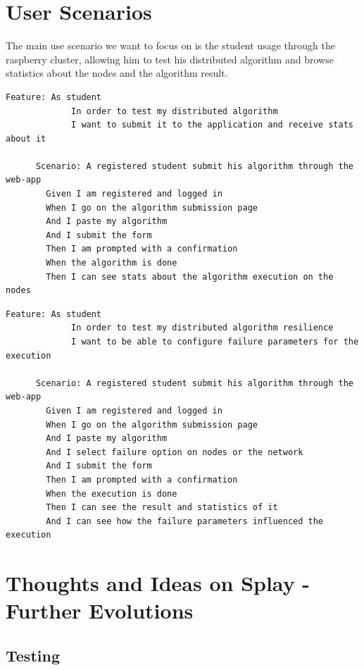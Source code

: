 \documentclass{article}
\begin{document}
\section{User Scenarios}

  The main use scenario we want to focus on is the student usage
  through the raspberry cluster, allowing him to test his distributed
  algorithm and browse statistics about the nodes and the algorithm result.\\

    \begin{lstlisting}[language=Gherkin]
    Feature: As student
             In order to test my distributed algorithm
             I want to submit it to the application and receive stats about it

      Scenario: A registered student submit his algorithm through the web-app
        Given I am registered and logged in
        When I go on the algorithm submission page
        And I paste my algorithm
        And I submit the form
        Then I am prompted with a confirmation
        When the algorithm is done
        Then I can see stats about the algorithm execution on the nodes
    \end{lstlisting}

    \begin{lstlisting}[language=Gherkin]
    Feature: As student
             In order to test my distributed algorithm resilience
             I want to be able to configure failure parameters for the execution

      Scenario: A registered student submit his algorithm through the web-app
        Given I am registered and logged in
        When I go on the algorithm submission page
        And I paste my algorithm
        And I select failure option on nodes or the network
        And I submit the form
        Then I am prompted with a confirmation
        When the execution is done
        Then I can see the result and statistics of it
        And I can see how the failure parameters influenced the execution
  \end{lstlisting}


\section{Thoughts and Ideas on Splay - Further Evolutions}

  \subsection{Testing}
\end{document}
